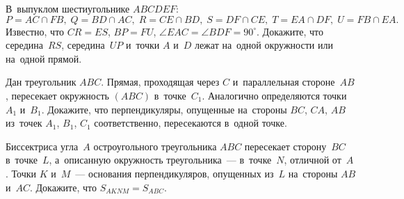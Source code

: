 


\begin{problems}


\item
В~выпуклом шестиугольнике $ABCDEF$:
\[
    P = AC \cap FB,\; Q = BD \cap AC,\; R = CE \cap BD,\;
    S = DF \cap CE,\; T = EA \cap DF,\; U = FB \cap EA.
\]
Известно, что $CR = ES$, $BP = FU$, $\angle EAC = \angle BDF = 90^\circ$.
Докажите, что середина~$RS$, середина~$UP$ и~точки $A$ и~$D$ лежат на~одной
окружности или на~одной прямой.

\item
Дан треугольник $ABC$.
Прямая, проходящая через $C$ и~параллельная стороне~$AB$, пересекает
окружность $(ABC)$ в~точке~$C_1$.
Аналогично определяются точки $A_1$ и~$B_1$.
Докажите, что перпендикуляры, опущенные на~стороны $BC$, $CA$, $AB$
из~точек $A_1$, $B_1$, $C_1$ соответственно, пересекаются в~одной точке.

\item
Биссектриса угла~$A$ остроугольного треугольника $ABC$ пересекает сторону~$BC$
в~точке~$L$, а~описанную окружность треугольника~--- в~точке~$N$, отличной
от~$A$.
Точки $K$ и~$M$~--- основания перпендикуляров, опущенных из~$L$
на~стороны $AB$ и~$AC$.
Докажите, что $S_{AKNM} = S_{ABC}$.




\end{problems}
